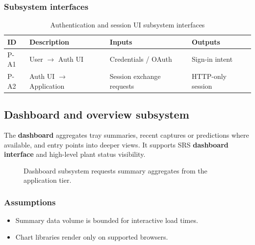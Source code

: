 \subsubsection{Subsystem interfaces}
\begin{table}[H]
\centering
\small
\begin{tabular}{|p{0.9cm}|p{3.4cm}|p{3.0cm}|p{3.5cm}|}
\hline
\textbf{ID} & \textbf{Description} & \textbf{Inputs} & \textbf{Outputs} \\
\hline
P-A1 & User $\rightarrow$ Auth UI & Credentials / OAuth & Sign-in intent \\
\hline
P-A2 & Auth UI $\rightarrow$ Application & Session exchange requests & HTTP-only session \\
\hline
\end{tabular}
\caption{Authentication and session UI subsystem interfaces}
\end{table}

\subsection{Dashboard and overview subsystem}

The \textbf{dashboard} aggregates tray summaries, recent captures or predictions where available, and entry points into deeper views. It supports SRS \textbf{dashboard interface} and high-level plant status visibility.

\begin{figure}[H]
\centering
{}
\caption{Dashboard subsystem requests summary aggregates from the application tier.}
\label{fig:pres-dash}
\end{figure}

\subsubsection{Assumptions}
\begin{itemize}
  \item Summary data volume is bounded for interactive load times.
  \item Chart libraries render only on supported browsers.
\end{itemize}


